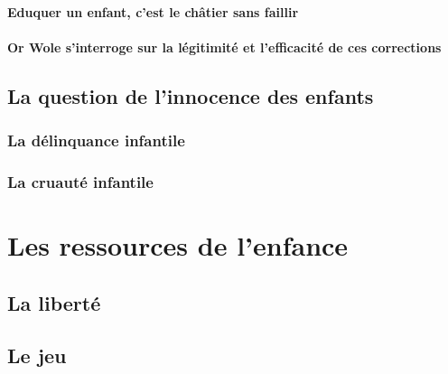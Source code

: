 \documentclass[a4paper, 11pt, hidelinks]{article}
\begin{document}
\paragraph{Eduquer un enfant, c'est le châtier sans faillir}



\paragraph{Or Wole s'interroge sur la légitimité et l'efficacité de ces corrections}


\subsection{La question de l'innocence des enfants}


\subsubsection{La délinquance infantile}


\subsubsection{La cruauté infantile}


\section{Les ressources de l'enfance}


\subsection{La liberté}



\subsection{Le jeu}
\end{document}
